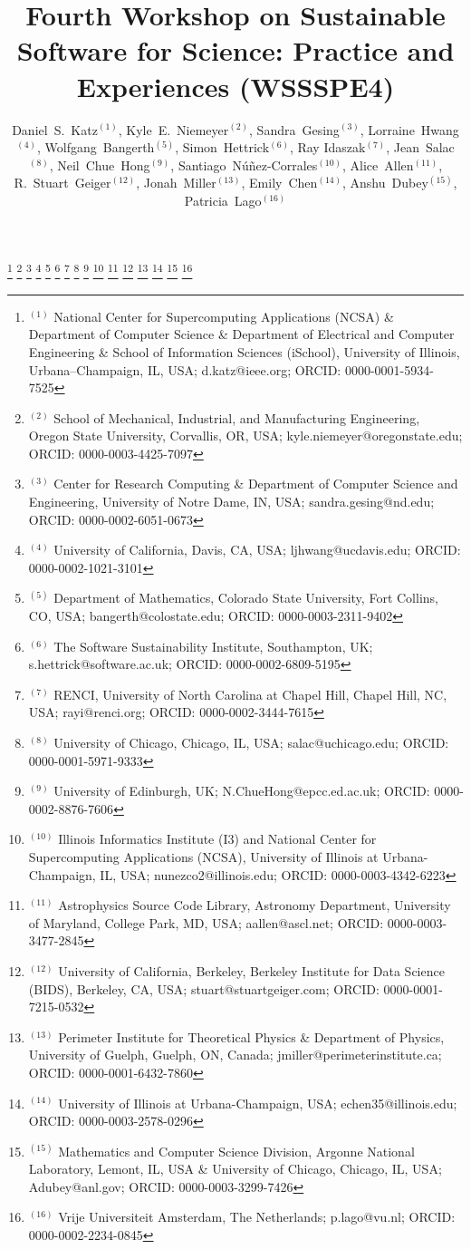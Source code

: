 \documentclass[11pt, oneside]{amsart}
\begin{document}
\title[]{Fourth Workshop on Sustainable Software for Science: Practice and Experiences (WSSSPE4)}

\author{Daniel~S.~Katz$^{(1)}$,
Kyle~E.~Niemeyer$^{(2)}$,
Sandra~Gesing$^{(3)}$,
Lorraine~Hwang$^{(4)}$,
Wolfgang~Bangerth$^{(5)}$,
Simon~Hettrick$^{(6)}$,
Ray Idaszak$^{(7)}$,
Jean~Salac$^{(8)}$,
Neil~Chue~Hong$^{(9)}$,
Santiago~N\'u\~nez-Corrales$^{(10)}$,
Alice~Allen$^{(11)}$,
R.~Stuart~Geiger$^{(12)}$,
Jonah~Miller$^{(13)}$,
Emily~Chen$^{(14)}$,
Anshu~Dubey$^{(15)}$,
Patricia~Lago$^{(16)}$
}

%
\thanks{{}$^{(1)}$ National Center for Supercomputing Applications (NCSA) \&
Department of Computer Science  \&
Department of Electrical and Computer Engineering  \&
School of Information Sciences (iSchool),
University of Illinois, Urbana--Champaign, IL, USA; d.katz@ieee.org; ORCID: 0000-0001-5934-7525}
%
\thanks{{}$^{(2)}$ School of Mechanical, Industrial, and Manufacturing Engineering,
Oregon State University, Corvallis, OR, USA; kyle.niemeyer@oregonstate.edu; ORCID: 0000-0003-4425-7097}
%
\thanks{{}$^{(3)}$ Center for Research Computing \& Department of Computer Science and Engineering,
University of Notre Dame, IN, USA; sandra.gesing@nd.edu; ORCID: 0000-0002-6051-0673}
%
\thanks{{}$^{(4)}$ University of California, Davis, CA, USA; ljhwang@ucdavis.edu; ORCID: 0000-0002-1021-3101}
%
\thanks{{}$^{(5)}$ Department of Mathematics, Colorado State
  University, Fort Collins, CO, USA; bangerth@colostate.edu; ORCID: 0000-0003-2311-9402}
%
\thanks{{}$^{(6)}$ The Software Sustainability Institute, Southampton, UK; s.hettrick@software.ac.uk; ORCID: 0000-0002-6809-5195}
%
\thanks{{}$^{(7)}$ RENCI, University of North Carolina at Chapel Hill, Chapel Hill, NC, USA; rayi@renci.org; ORCID: 0000-0002-3444-7615}
%
\thanks{{}$^{(8)}$ University of Chicago, Chicago, IL, USA; salac@uchicago.edu; ORCID: 0000-0001-5971-9333}
%
\thanks{{}$^{(9)}$ University of Edinburgh, UK; N.ChueHong@epcc.ed.ac.uk;
ORCID: 0000-0002-8876-7606}
%
\thanks{{}$^{(10)}$ Illinois Informatics Institute (I3) and National Center for Supercomputing Applications (NCSA), University of Illinois at Urbana-Champaign, IL, USA;
nunezco2@illinois.edu;
ORCID: 0000-0003-4342-6223}
%
\thanks{{}$^{(11)}$ Astrophysics Source Code Library, Astronomy Department, University of Maryland, College Park, MD, USA; aallen@ascl.net; ORCID: 0000-0003-3477-2845}
%
\thanks{{}$^{(12)}$ University of California, Berkeley, Berkeley Institute for Data Science (BIDS), Berkeley, CA, USA; stuart@stuartgeiger.com; ORCID: 0000-0001-7215-0532}
%
\thanks{{}$^{(13)}$ Perimeter Institute for Theoretical Physics \&
Department of Physics, University of Guelph,
Guelph, ON, Canada;
jmiller@perimeterinstitute.ca; ORCID: 0000-0001-6432-7860}
%
\thanks{{}$^{(14)}$ University of Illinois at Urbana-Champaign, USA; echen35@illinois.edu; ORCID: 0000-0003-2578-0296}
%
\thanks{{}$^{(15)}$ Mathematics and Computer Science Division,
Argonne National Laboratory,
Lemont, IL, USA \&
University of Chicago,
Chicago, IL, USA;
Adubey@anl.gov;
ORCID: 0000-0003-3299-7426}
%
\thanks{{}$^{(16)}$ Vrije Universiteit Amsterdam, The Netherlands; p.lago@vu.nl; ORCID: 0000-0002-2234-0845}
\end{document}
